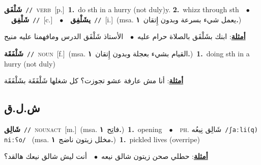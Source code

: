 \documentclass[10pt,a4paper,twoside]{article} %
\begin{document}
\begin{multicols}{2}
{\setlength\topsep{0pt}\textbf{\foreignlanguage{arabic}{شَلْفَق}}\ {\color{gray}\texttt{//}\color{black}}\ \textsc{verb}\ [p.]\ \textbf{1.}~do sth in a hurry (not duly)y.  \textbf{2.}~whizz through sth\ \ $\bullet$\ \ \setlength\topsep{0pt}\textbf{\foreignlanguage{arabic}{شَلْفِق}}\ {\color{gray}\texttt{//}\color{black}}\ [c.]\ \ $\bullet$\ \ \setlength\topsep{0pt}\textbf{\foreignlanguage{arabic}{يشَلْفِق}}\ {\color{gray}\texttt{//}\color{black}}\ [i.]\ \color{gray}(msa. \foreignlanguage{arabic}{يعمل شيء بسرعة وبدون إِتقان}~\foreignlanguage{arabic}{\textbf{١.}})\color{black}\  \begin{flushright}\color{gray}\foreignlanguage{arabic}{\textbf{\underline{\foreignlanguage{arabic}{أمثلة}}}: ابنك بشَلْفَق بالصلاة حرام عليه\ $\bullet$\ \  الأستاذ شَلْفَق الدرس ومافهمنا عليه منيح}\end{flushright}\color{black}} \vspace{2mm}

{\setlength\topsep{0pt}\textbf{\foreignlanguage{arabic}{شَلْفَقَة}}\ {\color{gray}\texttt{//}\color{black}}\ \textsc{noun}\ [f.]\ \color{gray}(msa. \foreignlanguage{arabic}{القيام بشيء بعجلة وبدون إِتقان}~\foreignlanguage{arabic}{\textbf{١.}})\color{black}\ \textbf{1.}~doing sth in a hurry (not duly)\  \begin{flushright}\color{gray}\foreignlanguage{arabic}{\textbf{\underline{\foreignlanguage{arabic}{أمثلة}}}: أنا مش عارفة عشو تجوزت؟ كل شغلها شَلْفَقَة بشَلْفَقَة}\end{flushright}\color{black}} \vspace{2mm}

\vspace{-3mm}
\subsection*{\color{blue}\foreignlanguage{arabic}{ش.ل.ق}\color{blue}{}} 

{\setlength\topsep{0pt}\textbf{\foreignlanguage{arabic}{شَالِق}}\ {\color{gray}\texttt{//}\color{black}}\ \textsc{noun\textunderscore act}\ [m.]\ \color{gray}(msa. \foreignlanguage{arabic}{فاتِح}~\foreignlanguage{arabic}{\textbf{١.}})\color{black}\ \textbf{1.}~opening\ \ $\bullet$\ \ \textsc{ph.} \color{gray} \foreignlanguage{arabic}{شَالِق نِيعُه}\color{black}\ {\color{gray}\texttt{/{\sffamily ʃaːli(q) niːʕo}/}\color{black}}\ \color{gray} (msa. \foreignlanguage{arabic}{مخلل زيتون ناضج}~\foreignlanguage{arabic}{\textbf{١.}})\color{black}\ \textbf{1.}~pickled lives (overripe)\  \begin{flushright}\color{gray}\foreignlanguage{arabic}{\textbf{\underline{\foreignlanguage{arabic}{أمثلة}}}: حطلي صحن زيتون شالق نيعه\ $\bullet$\ \  أنت ليش شالق نيعك هالقد؟}\end{flushright}\color{black}} \vspace{2mm}


\end{multicols}
\end{document}
